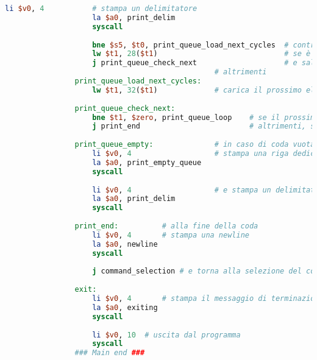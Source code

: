 \begin{center}
\begin{lstlisting}[language=mips, gobble=14, stepnumber=1]
                    li $v0, 4           # stampa un delimitatore
                    la $a0, print_delim
                    syscall
                    
                    bne $s5, $t0, print_queue_load_next_cycles  # controlla la politica di scheduling attuale
                    lw $t1, 28($t1)                             # se è A, carica il prossimo elemento della lista A
                    j print_queue_check_next                    # e salta al controllo del prossimo elemento
                                                # altrimenti
                print_queue_load_next_cycles:
                    lw $t1, 32($t1)             # carica il prossimo elemento della lista B
                    
                print_queue_check_next:
                    bne $t1, $zero, print_queue_loop    # se il prossimo elemento non è nullo, esegui un altro ciclo
                    j print_end                         # altrimenti, salta alla fine della stampa
                    
                print_queue_empty:              # in caso di coda vuota
                    li $v0, 4                   # stampa una riga dedicata
                    la $a0, print_empty_queue
                    syscall
                    
                    li $v0, 4                   # e stampa un delimitatore
                    la $a0, print_delim
                    syscall
                    
                print_end:          # alla fine della coda
                    li $v0, 4       # stampa una newline
                    la $a0, newline
                    syscall
                    
                    j command_selection # e torna alla selezione del comando
                    
                exit:
                    li $v0, 4       # stampa il messaggio di terminazione
                    la $a0, exiting
                    syscall
                    
                    li $v0, 10  # uscita dal programma
                    syscall
                ### Main end ###\end{lstlisting}
        \end{center}
